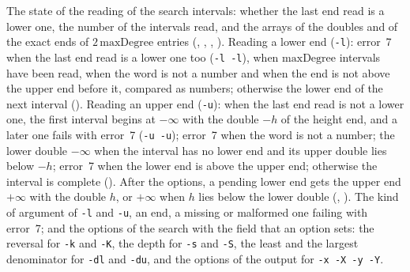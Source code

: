 \begin{definition}\label{def:cliIntervals}
  \leanok
  The state of the reading of the search intervals: whether the last end read is a lower one, the
  number of the intervals read, and the arrays of the doubles and of the exact ends of
  $2\,\mathrm{maxDegree}$ entries (, ,
  , ). Reading a lower end (\verb|-l|): error~7
  when the last end read is a lower one too (\verb|-l -l|), when $\mathrm{maxDegree}$ intervals have
  been read, when the word is not a number and when the end is not above the upper end before it,
  compared as numbers; otherwise the lower end of the next interval ().
  Reading an upper end (\verb|-u|): when the last end read is not a lower one, the first interval
  begins at $-\infty$ with the double $-h$ of the height end, and a later one fails with error~7
  (\verb|-u -u|); error~7 when the word is not a number; the lower double $-\infty$ when the
  interval has no lower end and its upper double lies below $-h$; error~7 when the lower end is
  above the upper end; otherwise the interval is complete (). After the
  options, a pending lower end gets the upper end $+\infty$ with the double $h$, or $+\infty$ when
  $h$ lies below the lower double (, ). The kind
  of argument of \verb|-l| and \verb|-u|, an end, a missing or malformed one failing with error~7;
  and the options of the search with the field that an option sets: the reversal for \verb|-k| and
  \verb|-K|, the depth for \verb|-s| and \verb|-S|, the least and the largest denominator for
  \verb|-dl| and \verb|-du|, and the options of the output for \verb|-x -X -y -Y|.
\end{definition}

